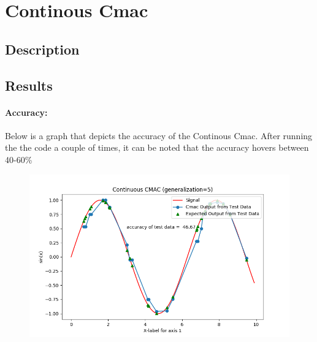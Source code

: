 \documentclass{article}
\begin{document}
\section{Continous Cmac}
\subsection{Description}
\subsection{Results}
  \paragraph{Accuracy:}
    Below is a graph that depicts the accuracy of the Continous Cmac. After running the the code a couple of times, it can
    be noted that the accuracy hovers between 40-60\%
  \begin{figure}[h!]
     \centering
     \includegraphics[scale=0.65]{./Results/continousAccuracy.png}
  \end{figure}
\end{document}
